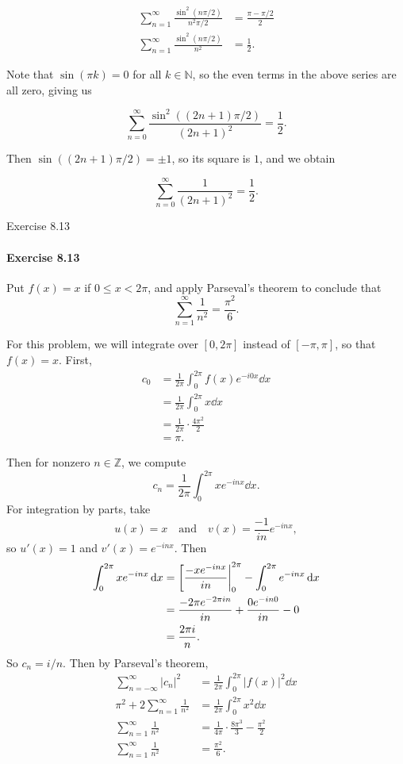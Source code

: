 \documentclass[12pt]{article}
\newenvironment{fullbox}{\begin{lrbox}{\savefullbox}\begin{minipage}{\dimexpr\textwidth-2\fboxsep\relax}}{\end{minipage}\end{lrbox}\begin{center}\framebox[\textwidth]{\usebox{\savefullbox}}\end{center}}
\newenvironment{pbox}[1][]{\begin{fullbox}\ifx#1\empty\else\paragraph{#1}\fi}{\end{fullbox}}
\theoremstyle{definition}
\newcommand{\isp}[1]{\quad\text{#1}\quad}
\newcommand{\N}{\mathbb{N}}
\newcommand{\Z}{\mathbb{Z}}
\begin{document}
\begin{align*}
    \sum_{n=1}^{\infty} \frac{\sin^2(n\pi/2)}{n^2\pi/2} &= \frac{\pi - \pi/2}{2} \\
    \sum_{n=1}^{\infty} \frac{\sin^2(n\pi/2)}{n^2} &= \frac{1}{2}.
\end{align*}

Note that $\sin(\pi k) = 0$ for all $k \in \N$, so the even terms in the above series are all zero, giving us

\[
    \sum_{n=0}^{\infty} \frac{\sin^2((2n + 1)\pi/2)}{(2n + 1)^2} = \frac{1}{2}.
\]

Then $\sin((2n + 1)\pi/2) = \pm1$, so its square is $1$, and we obtain

\[
    \sum_{n=0}^{\infty} \frac{1}{(2n + 1)^2} = \frac{1}{2}.
\]



\newpage
\begin{pbox}[Exercise 8.13]
    Put $f(x) = x$ if $0 \leq x <2\pi$, and apply Parseval's theorem to conclude that
    \[
        \sum_{n=1}^{\infty} \frac{1}{n^2} = \frac{\pi^2}{6}.
    \]
\end{pbox}

For this problem, we will integrate over $[0, 2\pi]$ instead of $[-\pi, \pi]$, so that $f(x) = x$. First,
\begin{align*}
    c_0 
        &= \frac{1}{2\pi} \int_{0}^{2\pi} f(x)e^{-i0x} \dd{x} \\
        &= \frac{1}{2\pi} \int_{0}^{2\pi} x \dd{x} \\
        &= \frac{1}{2\pi} \cdot \frac{4\pi^2}{2} \\
        &= \pi.
\end{align*}

Then for nonzero $n \in \Z$, we compute
\[
    c_n = \frac{1}{2\pi} \int_{0}^{2\pi} xe^{-inx} \dd{x}.
\]
For integration by parts, take
\[
    u(x) = x \isp{and} v(x) = \frac{-1}{in}e^{-inx},
\]
so $u'(x) = 1$ and $v'(x) = e^{-inx}$. Then
\begin{align*}
    \int_{0}^{2\pi} xe^{-inx} \dd{x}
        &= \eval[\frac{-xe^{-inx}}{in}|_{0}^{2\pi} - \int_{0}^{2\pi} e^{-inx} \dd{x} \\ 
        &= \frac{-2\pi e^{-2\pi in}}{in} + \frac{0 e^{-in0}}{in} - 0 \\ 
        &= \frac{2\pi i}{n}.
\end{align*}
So $c_n = i/n$. Then by Parseval's theorem,
\begin{align*}
    \sum_{n=-\infty}^{\infty} |c_n|^2 &= \frac{1}{2\pi} \int_{0}^{2\pi} |f(x)|^2 \dd{x} \\
    \pi^2 + 2\sum_{n=1}^{\infty} \frac{1}{n^2} &= \frac{1}{2\pi} \int_{0}^{2\pi} x^2 \dd{x} \\
    \sum_{n=1}^{\infty} \frac{1}{n^2} &= \frac{1}{4\pi} \cdot \frac{8\pi^3}{3} - \frac{\pi^2}{2} \\
    \sum_{n=1}^{\infty} \frac{1}{n^2} &= \frac{\pi^2}{6}.
\end{align*}
\end{document}
